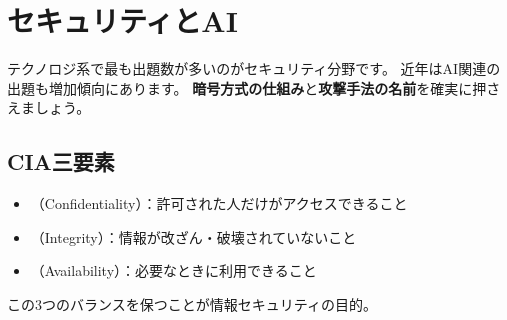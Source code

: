 \chapter{セキュリティとAI}


テクノロジ系で最も出題数が多いのがセキュリティ分野です。
近年はAI関連の出題も増加傾向にあります。
\textbf{暗号方式の仕組み}と\textbf{攻撃手法の名前}を確実に押さえましょう。

\section{CIA三要素}

\begin{teigi}[情報セキュリティのCIA]
\begin{itemize}
  \item {}（Confidentiality）：許可された人だけがアクセスできること
  \item {}（Integrity）：情報が改ざん・破壊されていないこと
  \item {}（Availability）：必要なときに利用できること
\end{itemize}
この3つのバランスを保つことが情報セキュリティの目的。
\end{teigi}

\begin{hikaku}[CIA三要素の具体例]
\end{hikaku}

